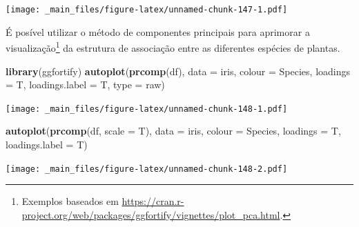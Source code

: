 \documentclass[
]{book}
\newenvironment{Shaded}{\begin{snugshade}}{\end{snugshade}}
\newcommand{\DataTypeTok}[1]{\textcolor[rgb]{0.13,0.29,0.53}{#1}}
\newcommand{\KeywordTok}[1]{\textcolor[rgb]{0.13,0.29,0.53}{\textbf{#1}}}
\newcommand{\NormalTok}[1]{#1}
\newcommand{\StringTok}[1]{\textcolor[rgb]{0.31,0.60,0.02}{#1}}
\theoremstyle{definition}
\theoremstyle{definition}
\theoremstyle{definition}
\theoremstyle{remark}
\begin{document}
\texttt{[image: \_main\_files/figure-latex/unnamed-chunk-147-1.pdf]}

É posível utilizar o método de componentes principais para aprimorar a visualização\footnote{Exemplos baseados em \url{https://cran.r-project.org/web/packages/ggfortify/vignettes/plot_pca.html}.} da estrutura de associação entre as diferentes espécies de plantas.

\begin{Shaded}
\begin{Highlighting}[]
\KeywordTok{library}\NormalTok{(ggfortify)}
\KeywordTok{autoplot}\NormalTok{(}\KeywordTok{prcomp}\NormalTok{(df), }\DataTypeTok{data =}\NormalTok{ iris, }\DataTypeTok{colour =} \StringTok{\textquotesingle{}Species\textquotesingle{}}\NormalTok{, }\DataTypeTok{loadings =}\NormalTok{ T, }\DataTypeTok{loadings.label =}\NormalTok{ T, }\DataTypeTok{type =} \StringTok{\textquotesingle{}raw\textquotesingle{}}\NormalTok{)}
\end{Highlighting}
\end{Shaded}

\texttt{[image: \_main\_files/figure-latex/unnamed-chunk-148-1.pdf]}

\begin{Shaded}
\begin{Highlighting}[]
\KeywordTok{autoplot}\NormalTok{(}\KeywordTok{prcomp}\NormalTok{(df, }\DataTypeTok{scale =}\NormalTok{ T), }\DataTypeTok{data =}\NormalTok{ iris, }\DataTypeTok{colour =} \StringTok{\textquotesingle{}Species\textquotesingle{}}\NormalTok{, }\DataTypeTok{loadings =}\NormalTok{ T, }\DataTypeTok{loadings.label =}\NormalTok{ T)}
\end{Highlighting}
\end{Shaded}

\texttt{[image: \_main\_files/figure-latex/unnamed-chunk-148-2.pdf]}
\end{document}
